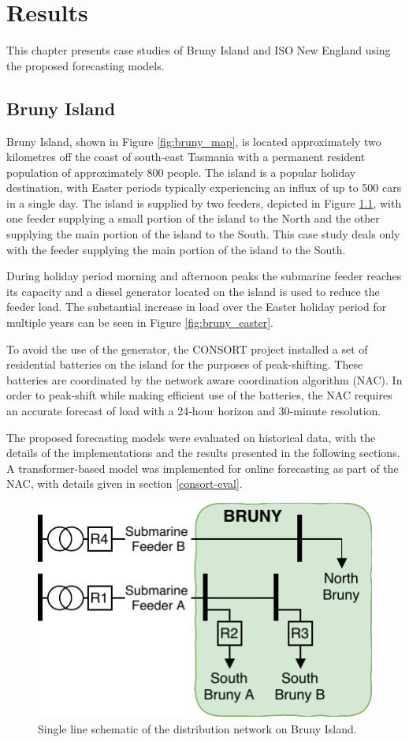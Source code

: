 \chapter{Results}
This chapter presents case studies of Bruny Island and ISO New England using the proposed forecasting models.

\section{Bruny Island}
Bruny Island, shown in Figure \ref{fig:bruny_map}, is located approximately two kilometres off the coast of south-east Tasmania with a permanent resident population of approximately 800 people.
The island is a popular holiday destination, with Easter periods typically experiencing an influx of up to 500 cars in a single day.
The island is supplied by two feeders, depicted in Figure \ref{fig:bruny_network}, with  one feeder supplying a small portion of the island to the North and the other supplying the main portion of the island to the South.
This case study deals only with the feeder supplying the main portion of the island to the South.

During holiday period morning and afternoon peaks the submarine feeder reaches its capacity and a diesel generator located on the island is used to reduce the feeder load.
The substantial increase in load over the Easter holiday period for multiple years can be seen in Figure \ref{fig:bruny_easter}.

To avoid the use of the generator, the CONSORT project installed a set of residential batteries on the island for the purposes of peak-shifting.
These batteries are coordinated by the network aware coordination algorithm (NAC).
In order to peak-shift while making efficient use of the batteries, the NAC requires an accurate forecast of load with a 24-hour horizon and 30-minute resolution.

The proposed forecasting models were evaluated on historical data, with the details of the implementations and the results presented in the following sections.
A transformer-based model was implemented for online forecasting as part of the NAC, with details given in section \ref{consort-eval}.

\begin{figure}[htbp]
	\centerline{\includegraphics[width=.45\textwidth]{images/bruny_single_line.pdf}}
	\caption{Single line schematic of the distribution network on Bruny Island.}
	\label{fig:bruny_network}
\end{figure}

